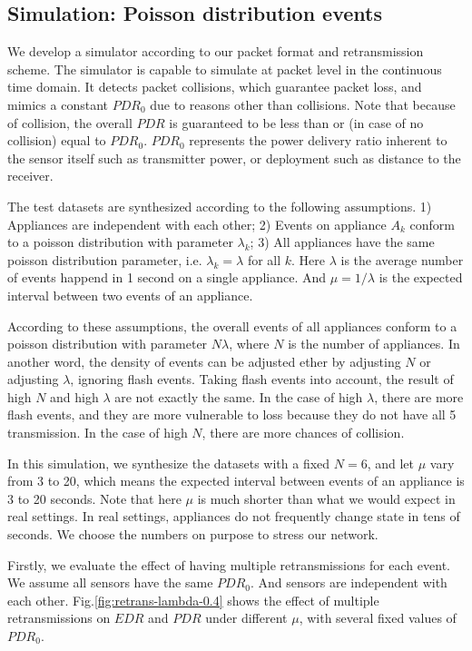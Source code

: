 \subsection{Simulation: Poisson distribution events}

We develop a simulator according to our packet format and retransmission scheme. The simulator is capable to simulate at packet level in the continuous time domain. It detects packet collisions, which guarantee packet loss, and mimics a constant $PDR_0$ due to reasons other than collisions. Note that because of collision, the overall $PDR$ is guaranteed to be less than or (in case of no collision) equal to $PDR_0$. $PDR_0$ represents the power delivery ratio inherent to the sensor itself such as transmitter power, or deployment such as distance to the receiver. 

The test datasets are synthesized according to the following assumptions. 1) Appliances are independent with each other; 2) Events on appliance $A_k$ conform to a poisson distribution with parameter $\lambda_k$; 3) All appliances have the same poisson distribution parameter, i.e. $\lambda_k = \lambda$ for all $k$. Here $\lambda$ is the average number of events happend in 1 second on a single appliance. And $\mu = 1/\lambda$ is the expected interval between two events of an appliance. 

According to these assumptions, the overall events of all appliances conform to a poisson distribution with parameter $N\lambda$, where $N$ is the number of appliances. In another word, the density of events can be adjusted ether by adjusting $N$ or adjusting $\lambda$, ignoring flash events. Taking flash events into account, the result of high $N$ and high $\lambda$ are not exactly the same. In the case of high $\lambda$, there are more flash events, and they are more vulnerable to loss because they do not have all 5 transmission. In the case of high $N$, there are more chances of collision. 

In this simulation, we synthesize the datasets with a fixed $N=6$, and let $\mu$ vary from 3 to 20, which means the expected interval between events of an appliance is 3 to 20 seconds. Note that here $\mu$ is much shorter than what we would expect in real settings. In real settings, appliances do not frequently change state in tens of seconds. We choose the numbers on purpose to stress our network. 

Firstly, we evaluate the effect of having multiple retransmissions for each event. We assume all sensors have the same $PDR_0$. And sensors are independent with each other. Fig.\ref{fig:retrans-lambda-0.4} shows the effect of multiple retransmissions on $EDR$ and $PDR$ under different $\mu$, with several fixed values of $PDR_0$. 

